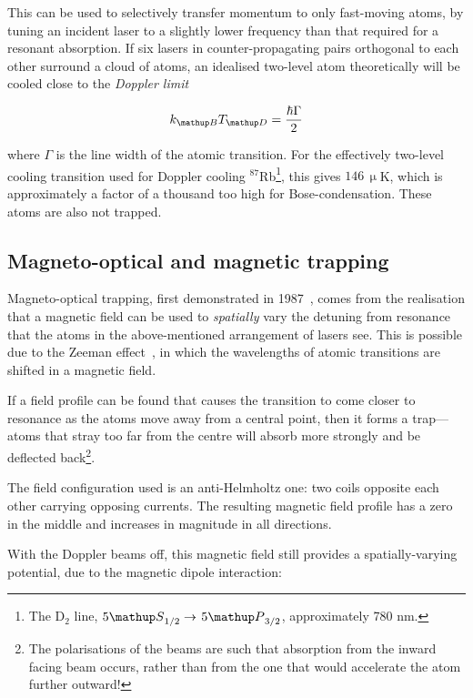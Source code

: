 This can be used to selectively transfer momentum to only fast-moving atoms, by tuning an incident laser to a slightly lower frequency than that required for a resonant absorption. If six lasers in counter-propagating pairs orthogonal to each other surround a cloud of atoms, an idealised two-level atom theoretically will be cooled close to the \emph{Doppler limit}~\cite[p 58]{metcalf_laser_1999}

\begin{equation}
k_\up{B} T_\up{D} = \frac{\hbar\Gamma}2
\end{equation}

where $\Gamma$ is the line width of the atomic transition. For the effectively two-level cooling transition used for Doppler cooling $^{87}$Rb\footnote{The D$_2$ line, $5\up{S}_{1/2}\rightarrow$ $5\up{P}_{3/2}$, approximately 780 nm.}, this gives $146\,\upmu$K, which is approximately a factor of a thousand too high for Bose-condensation. These atoms are also not trapped.

\subsection{Magneto-optical and magnetic trapping}

Magneto-optical trapping, first demonstrated in 1987~\cite{raab_trapping_1987}, comes from the realisation that a magnetic field can be used to \emph{spatially} vary the detuning from resonance that the atoms in the above-mentioned arrangement of lasers see. This is possible due to the Zeeman effect~\cite{zeeman_influence_1897}, in which the wavelengths of atomic transitions are shifted in a magnetic field.

If a field profile can be found that causes the transition to come closer to resonance as the atoms move away from a central point, then it forms a trap---atoms  that stray too far from the centre will absorb more strongly and be deflected back\footnote{The polarisations of the beams are such that absorption from the inward facing beam occurs, rather than from the one that would accelerate the atom further outward!}.

The field configuration used is an anti-Helmholtz one: two coils opposite each other carrying opposing currents. The resulting magnetic field profile has a zero in the middle and increases in magnitude in all directions.

With the Doppler beams off, this magnetic field still provides a spatially-varying potential, due to the magnetic dipole interaction:

